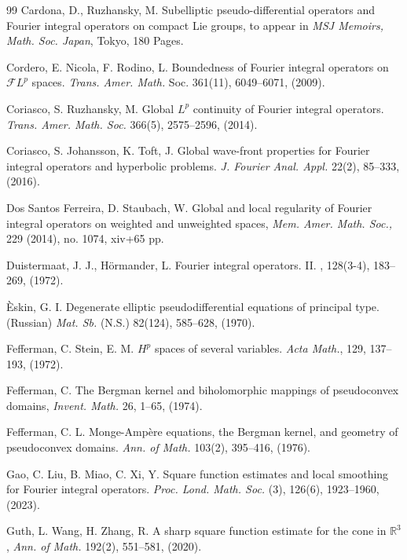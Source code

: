 \documentclass[12pt, reqno]{amsart}
\theoremstyle{definition}
\theoremstyle{remark}
\numberwithin{equation}{section}
\begin{document}
\begin{thebibliography}{99}
 Cardona, D., Ruzhansky, M. Subelliptic pseudo-differential operators and Fourier integral operators on compact Lie groups, to appear in  {\it MSJ Memoirs, Math. Soc. Japan},  Tokyo, 180 Pages.

  Cordero, E. Nicola, F. Rodino, L. Boundedness of Fourier integral operators on $\mathscr{F}L^p$ spaces. {\it Trans. Amer. Math.} Soc. 361(11), 6049--6071, (2009).

  Coriasco, S. Ruzhansky, M. Global $L^p$ continuity of Fourier integral operators. {\it Trans. Amer. Math. Soc.} 366(5), 2575--2596, (2014).

 Coriasco, S. Johansson, K. Toft, J. Global wave-front properties for Fourier integral operators and hyperbolic problems. {\it J. Fourier Anal. Appl.} 22(2), 85--333, (2016). 

 Dos Santos Ferreira, D. Staubach, W. Global and local regularity of Fourier integral operators on weighted and unweighted spaces, {\it Mem. Amer. Math. Soc.,} 229 (2014), no. 1074, xiv+65 pp.

 Duistermaat, J. J., H{\"o}rmander, L.
\newblock Fourier integral operators. {II}.
, 128(3-4), 183--269, (1972).

  Èskin, G. I. Degenerate elliptic pseudodifferential equations of principal type. (Russian) {\it Mat. Sb.} (N.S.) 82(124), 585--628, (1970).

  Fefferman, C.   Stein, E. M. $H^p$ spaces of several variables. {\it Acta Math.}, 129, 137--193, (1972).

 Fefferman, C. The Bergman kernel and biholomorphic mappings of pseudoconvex domains, {\it Invent. Math.} 26, 1--65, (1974).

 Fefferman, C. L. Monge-Ampère equations, the Bergman kernel, and geometry of pseudoconvex domains. {\it Ann. of Math.} 103(2), 395--416, (1976).

 Gao, C. Liu, B. Miao, C. Xi, Y.
Square function estimates and local smoothing for Fourier integral operators. {\it Proc. Lond. Math. Soc.} (3), 126(6), 1923--1960, (2023). 

  Guth, L. Wang, H.  Zhang, R. A sharp square function estimate for the cone in $\mathbb{R}^3$, {\it Ann. of Math.}  192(2),
551--581, (2020).


\end{thebibliography}
\end{document}
